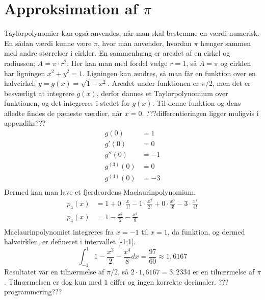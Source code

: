 \section{Approksimation af $\pi$}
Taylorpolynomier kan også anvendes, når man skal bestemme en værdi numerisk. En sådan værdi kunne være $\pi$, hvor man anvender, hvordan $\pi$ hænger sammen med andre størrelser i cirkler. En sammenhæng er arealet af en cirkel og radiussen; $A=\pi \cdot r^2$. Her kan man med fordel vælge $r=1$, så $A=\pi$ og cirklen har ligningen $x^2+y^2=1$. Ligningen kan ændres, så man får en funktion over en halvcirkel; $y=g(x)=\sqrt{1-x^2}$. Arealet under funktionen er $\pi/2$, men det er besværligt at integrere $g(x)$, derfor dannes et Taylorpolynomium over funktionen, og det integreres i stedet for $g(x)$. Til denne funktion og dens afledte findes de pæneste værdier, når $x=0$.
???differentieringen ligger muligvis i appendiks???
\begin{align*}
g(0) &= 1 \\
g'(0) &= 0 \\
g''(0) &= -1 \\
g^{(3)}(0) &= 0 \\
g^{(4)}(0) &= -3 \\
\end{align*}
Dermed kan man lave et fjerdeordens Maclaurinpolynomium.
\begin{align*}
p_{4} (x) &= 1 + 0\cdot \frac{x}{1!} - 1\cdot \frac{x^2}{2!} + 0\cdot \frac{x^3}{3!} - 3\cdot \frac{x^4}{4!}
\\
p_{4} (x) &= 1-\frac{x^2}{2}-\frac{x^4}{8} \\
\end{align*}
Maclaurinpolynomiet integreres fra $x=-1$ til $x=1$, da funktion, og dermed halvcirklen, er defineret i intervallet [-1;1].
\[
\int_{-1}^{1} 1-\frac{x^2}{2}-\frac{x^4}{8} dx = \frac{97}{60} \approx 1,6167
\]
Resultatet var en tilnærmelse af $\pi/2$, så $2\cdot 1,6167 = 3,2334$ er en tilnærmelse af $\pi$. Tilnærmelsen er dog kun med $1$ ciffer og ingen korrekte decimaler. ???programmering???




